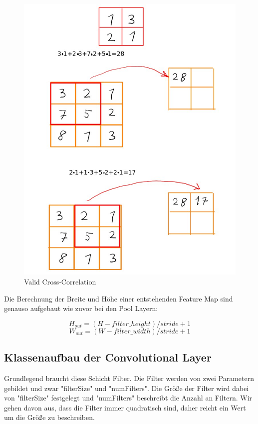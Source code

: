 \documentclass[12pt]{article}
\begin{document}
\begin{figure}[H]
\centering
\includegraphics[scale=0.5]{./Images/005_Valid_Correlation.jpg}
\caption{Valid Cross-Correlation}
\label{Valid Cross-Correlation}
\end{figure}

Die Berechnung der Breite und Höhe einer entstehenden Feature Map sind genauso aufgebaut wie zuvor bei den Pool Layern:

$$H_{out} = (H - filter\_height)/stride + 1$$
$$W_{out} = (W - filter\_ width)/stride + 1$$












\cleardoublepage
\subsection{Klassenaufbau der Convolutional Layer}
Grundlegend braucht diese Schicht Filter. Die Filter werden von zwei Parametern gebildet und zwar "filterSize" und "numFilters". Die Größe der Filter wird dabei von "filterSize" festgelegt und "numFilters" beschreibt die Anzahl an Filtern. Wir gehen davon aus, dass die Filter immer quadratisch sind, daher reicht ein Wert um die Größe zu beschreiben.
\end{document}

